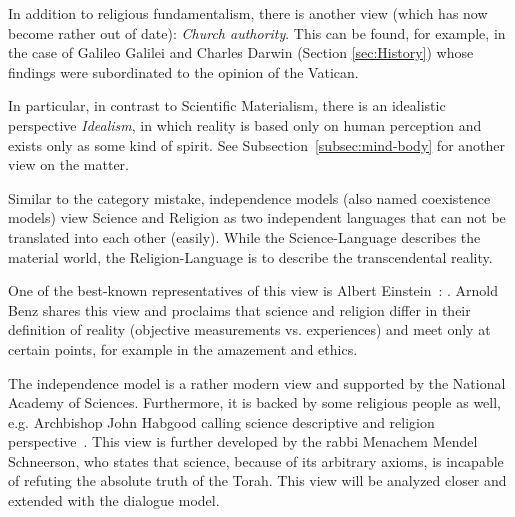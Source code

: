 In addition to religious fundamentalism, there is another view (which has now become rather out of date): \emph{Church authority}.
This can be found, for example, in the case of Galileo Galilei and Charles Darwin (Section \ref{sec:History}) whose findings were subordinated to the opinion of the Vatican.


In particular, in contrast to Scientific Materialism, there is an idealistic perspective \emph{Idealism}, in which reality is based only on human perception and exists only as some kind of spirit.
See Subsection~\ref{subsec:mind-body} for another view on the matter.





Similar to the category mistake, independence models (also named coexistence models) view Science and Religion as two independent languages that can not be translated into each other (easily).
While the Science-Language describes the  material world, the Religion-Language is to describe the transcendental reality.

One of the best-known representatives of this view is Albert Einstein~\cite[p.~605\,ff.]{einstein1940science}:
.
Arnold Benz shares this view and proclaims that science and religion
differ in their definition of reality (objective measurements vs. experiences) and meet only at certain points, for example in the amazement and ethics.

The independence model is a rather modern view and supported by the
National Academy of Sciences.
Furthermore, it is backed by some religious people as well, e.g. Archbishop John Habgood calling science descriptive and religion perspective~\cite{habgood1964religion}.
This view is further developed by the rabbi Menachem Mendel Schneerson, who states that science, because of its arbitrary axioms, is incapable of refuting the absolute truth of the Torah. This view will be analyzed closer and extended with the dialogue model.

